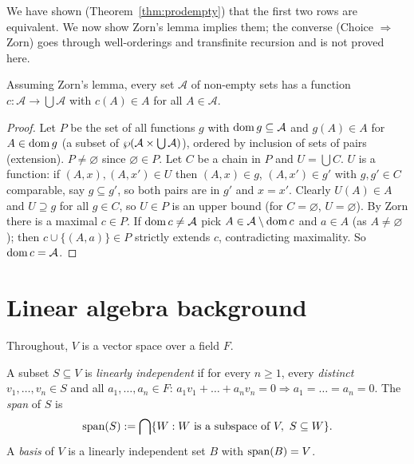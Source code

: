 We have shown (Theorem~\ref{thm:prodempty}) that the first two rows are equivalent. We now show Zorn's lemma implies them; the converse (Choice $\Rightarrow$ Zorn) goes through well-orderings and transfinite recursion and is not proved here.

\begin{theorem}\label{thm:zorn-choice}
	Assuming Zorn's lemma, every set $\mathcal A$ of non-empty sets has a function $c:\mathcal A\to\bigcup\mathcal A$ with $c(A)\in A$ for all $A\in\mathcal A$.
\end{theorem}
\begin{proof}
	Let $P$ be the set of all functions $g$ with $\operatorname{dom} g\subseteq\mathcal A$ and $g(A)\in A$ for $A\in\operatorname{dom} g$ (a subset of $\wp(\mathcal A\times\bigcup\mathcal A)$), ordered by inclusion of sets of pairs (extension). $P\ne\varnothing$ since $\varnothing\in P$. Let $C$ be a chain in $P$ and $U=\bigcup C$. $U$ is a function: if $(A,x),(A,x')\in U$ then $(A,x)\in g$, $(A,x')\in g'$ with $g,g'\in C$ comparable, say $g\subseteq g'$, so both pairs are in $g'$ and $x=x'$. Clearly $U(A)\in A$ and $U\supseteq g$ for all $g\in C$, so $U\in P$ is an upper bound (for $C=\varnothing$, $U=\varnothing$). By Zorn there is a maximal $c\in P$. If $\operatorname{dom} c\ne\mathcal A$ pick $A\in\mathcal A\setminus\operatorname{dom} c$ and $a\in A$ (as $A\ne\varnothing$); then $c\cup\{(A,a)\}\in P$ strictly extends $c$, contradicting maximality. So $\operatorname{dom} c=\mathcal A$.
\end{proof}

\section{Linear algebra background}

Throughout, $V$ is a vector space over a field $F$.

\begin{definition}
	A subset $S\subseteq V$ is \emph{linearly independent} if for every $n\ge1$, every \emph{distinct} $v_1,\dots,v_n\in S$ and all $a_1,\dots,a_n\in F$: $a_1v_1+\dots+a_nv_n=0\Rightarrow a_1=\dots=a_n=0$. The \emph{span} of $S$ is
	\[
	\operatorname{span}(S):=\bigcap\{W:W\text{ is a subspace of }V,\ S\subseteq W\}.
	\]
	A \emph{basis} of $V$ is a linearly independent set $B$ with $\operatorname{span}(B)=V$.
\end{definition}

